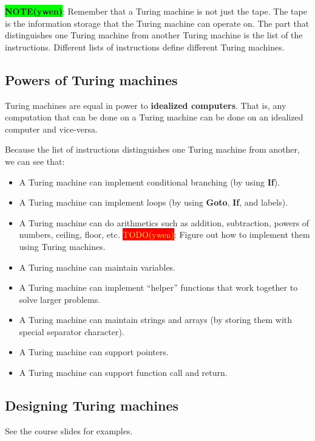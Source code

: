 \documentclass[12pt, letterpaper, oneside]{book}
\begin{document}
\colorbox{lime}{\textbf{NOTE(ywen)}}: Remember that a Turing machine is not just the tape. The tape is the information
storage that the Turing machine can operate on. The part that distinguishes one Turing machine from another Turing
machine is the list of the instructions. Different lists of instructions define different Turing machines.

\subsection{Powers of Turing machines}

Turing machines are equal in power to \textbf{idealized computers}. That is, any computation that can be done on a
Turing machine can be done on an idealized computer and vice-versa.

Because the list of instructions distinguishes one Turing machine from another, we can see that:
\begin{itemize}
  \item A Turing machine can implement conditional branching (by using \textbf{If}).
  \item A Turing machine can implement loops (by using \textbf{Goto}, \textbf{If}, and labels).
  \item A Turing machine can do arithmetics such as addition, subtraction, powers of numbers, ceiling, floor, etc.
        \colorbox{red}{\textcolor{yellow}{TODO(ywen)}}: Figure out how to implement them using Turing machines.
  \item A Turing machine can maintain variables.
  \item A Turing machine can implement ``helper'' functions that work together to solve larger problems.
  \item A Turing machine can maintain strings and arrays (by storing them with special separator character).
  \item A Turing machine can support pointers.
  \item A Turing machine can support function call and return.
\end{itemize}

\subsection{Designing Turing machines}

See the course slides for examples.
\end{document}
